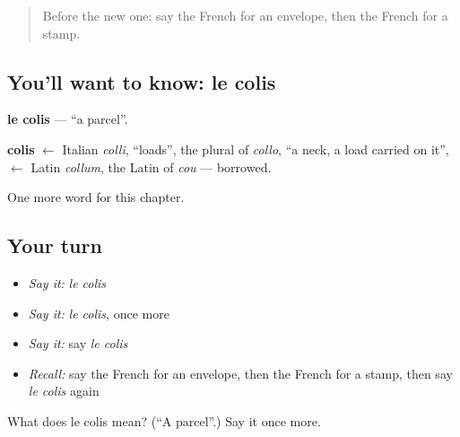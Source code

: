 \begin{quote}
Before the new one: say the French for an envelope, then the French for a stamp.
\end{quote}

\subsection*{You'll want to know: le colis}
\textbf{le colis} — \textquotedblleft{}a parcel\textquotedblright{}.

\begin{cousinweb}
\textbf{colis} $\leftarrow$ Italian \emph{colli}, \textquotedblleft{}loads\textquotedblright{}, the plural of \emph{collo}, \textquotedblleft{}a neck, a load carried on it\textquotedblright{}, $\leftarrow$ Latin \emph{collum}, the Latin of \emph{cou} — borrowed.
\end{cousinweb}

\begin{grammarlens}[title={What you've built}]
One more word for this chapter.
\end{grammarlens}

\subsection*{Your turn}
\begin{itemize}
\raggedright
  \item \emph{Say it:} \emph{le colis}
  \item \emph{Say it:} \emph{le colis}, once more
  \item \emph{Say it:} say \emph{le colis}
  \item \emph{Recall:} say the French for an envelope, then the French for a stamp, then say \emph{le colis} again
\end{itemize}

\begin{tcolorbox}[breakable,colback=teal!4,colframe=teal!35!black,title={Before you move on}]
What does le colis mean? (\textquotedblleft{}A parcel\textquotedblright{}.) Say it once more.
\end{tcolorbox}

